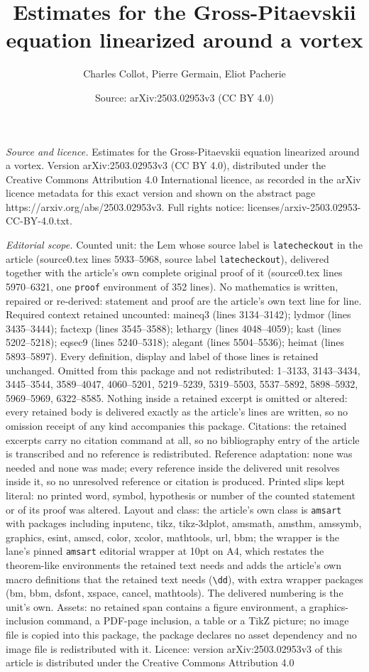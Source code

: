 \documentclass[10pt,a4paper]{amsart}
\title[Estimates for the Gross-Pitaevskii equation linearized aroun]{Estimates for the Gross-Pitaevskii equation linearized around a vortex}
\author{Charles Collot, Pierre Germain, Eliot Pacherie}
\date{Source: arXiv:2503.02953v3 (CC BY 4.0)}
\begin{document}
\maketitle

\noindent\emph{Source and licence.} Estimates for the Gross-Pitaevskii equation linearized around a vortex. Version arXiv:2503.02953v3 (CC BY 4.0), distributed under the Creative Commons Attribution 4.0 International licence, as recorded in the arXiv licence metadata for this exact version and shown on the abstract page https://arxiv.org/abs/2503.02953v3. Full rights notice: licenses/arxiv-2503.02953-CC-BY-4.0.txt.\par\smallskip

\noindent\textit{Editorial scope.} Counted unit: the Lem whose source label is \texttt{latecheckout} in the article (source0.tex lines 5933--5968, source label \texttt{latecheckout}), delivered together with the article's own complete original proof of it (source0.tex lines 5970--6321, one \texttt{proof} environment of 352 lines). No mathematics is written, repaired or re-derived: statement and proof are the article's own text line for line. Required context retained uncounted: maineq3 (lines 3134--3142); lydmor (lines 3435--3444); factexp (lines 3545--3588); lethargy (lines 4048--4059); kast (lines 5202--5218); eqsec9 (lines 5240--5318); alegant (lines 5504--5536); heimat (lines 5893--5897). Every definition, display and label of those lines is retained unchanged. Omitted from this package and not redistributed: 1--3133, 3143--3434, 3445--3544, 3589--4047, 4060--5201, 5219--5239, 5319--5503, 5537--5892, 5898--5932, 5969--5969, 6322--8585. Nothing inside a retained excerpt is omitted or altered: every retained body is delivered exactly as the article's lines are written, so no omission receipt of any kind accompanies this package. Citations: the retained excerpts carry no citation command at all, so no bibliography entry of the article is transcribed and no reference is redistributed. Reference adaptation: none was needed and none was made; every reference inside the delivered unit resolves inside it, so no unresolved reference or citation is produced. Printed slips kept literal: no printed word, symbol, hypothesis or number of the counted statement or of its proof was altered. Layout and class: the article's own class is \texttt{amsart} with packages including inputenc, tikz, tikz-3dplot, amsmath, amsthm, amssymb, graphics, esint, amscd, color, xcolor, mathtools, url, bbm; the wrapper is the lane's pinned \texttt{amsart} editorial wrapper at 10pt on A4, which restates the theorem-like environments the retained text needs and adds the article's own macro definitions that the retained text needs (\texttt{\textbackslash dd}), with extra wrapper packages (bm, bbm, dsfont, xspace, cancel, mathtools). The delivered numbering is the unit's own. Assets: no retained span contains a figure environment, a graphics-inclusion command, a PDF-page inclusion, a table or a TikZ picture; no image file is copied into this package, the package declares no asset dependency and no image file is redistributed with it. Licence: version arXiv:2503.02953v3 of this article is distributed under the Creative Commons Attribution 4.0 
\end{document}
